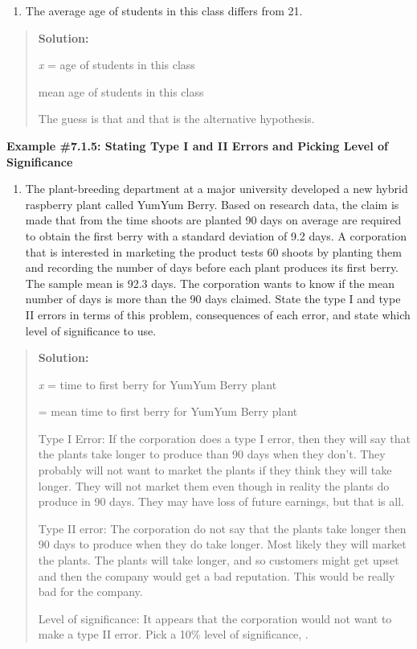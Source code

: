 \documentclass[]{book}
\providecommand{\tightlist}{%
  \setlength{\itemsep}{0pt}\setlength{\parskip}{0pt}}
\begin{document}
\begin{enumerate}
\def\labelenumi{\alph{enumi}.}
\setcounter{enumi}{2}
\tightlist
\item
  The average age of students in this class differs from 21.
\end{enumerate}

\begin{quote}
\textbf{Solution:}

\emph{x} = age of students in this class

mean age of students in this class

The guess is that and that is the alternative hypothesis.
\end{quote}

\textbf{Example \#7.1.5: Stating Type I and II Errors and Picking Level of
Significance}

\begin{enumerate}
\def\labelenumi{\alph{enumi}.}
\tightlist
\item
  The plant-breeding department at a major university developed a new
  hybrid raspberry plant called YumYum Berry. Based on research data,
  the claim is made that from the time shoots are planted 90 days on
  average are required to obtain the first berry with a standard
  deviation of 9.2 days. A corporation that is interested in marketing
  the product tests 60 shoots by planting them and recording the
  number of days before each plant produces its first berry. The
  sample mean is 92.3 days. The corporation wants to know if the mean
  number of days is more than the 90 days claimed. State the type I
  and type II errors in terms of this problem, consequences of each
  error, and state which level of significance to use.
\end{enumerate}

\begin{quote}
\textbf{Solution:}

\emph{x} = time to first berry for YumYum Berry plant

= mean time to first berry for YumYum Berry plant

Type I Error: If the corporation does a type I error, then they will
say that the plants take longer to produce than 90 days when they
don't. They probably will not want to market the plants if they think
they will take longer. They will not market them even though in
reality the plants do produce in 90 days. They may have loss of future
earnings, but that is all.

Type II error: The corporation do not say that the plants take longer
then 90 days to produce when they do take longer. Most likely they
will market the plants. The plants will take longer, and so customers
might get upset and then the company would get a bad reputation. This
would be really bad for the company.

Level of significance: It appears that the corporation would not want
to make a type II error. Pick a 10\% level of significance, .
\end{quote}
\end{document}
